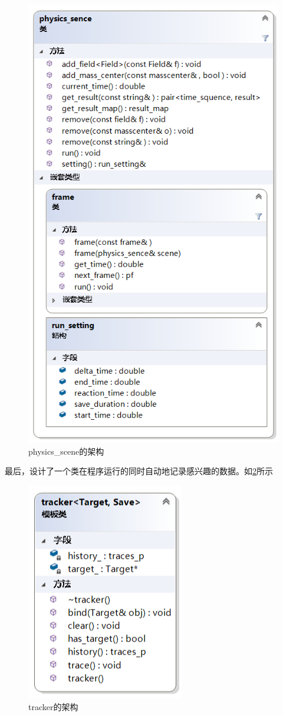 \begin{figure} 
    \centering 
    \includegraphics[width=.7\textwidth]{ClassDiagram3.png}
\caption{physics\_scene的架构} %
\label{cd3} %
\end{figure}

最后，设计了一个类在程序运行的同时自动地记录感兴趣的数据。如\ref{cd5}所示

\begin{figure} 
    \centering 
    \includegraphics[width=.4\textwidth]{ClassDiagram5.png}
\caption{tracker的架构} %
\label{cd5} %
\end{figure}

